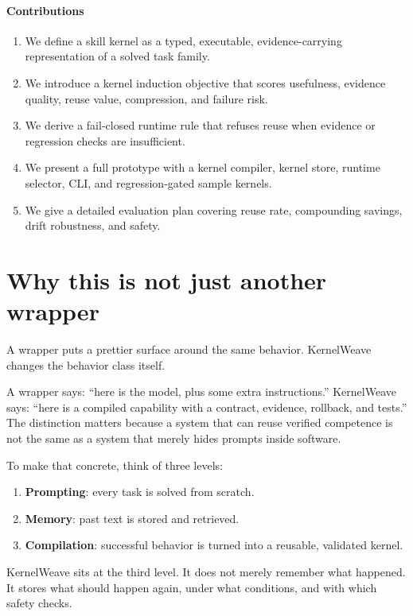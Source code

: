 \documentclass{article}
\begin{document}
\paragraph{Contributions}
\begin{enumerate}[leftmargin=1.2em]
\item We define a skill kernel as a typed, executable, evidence-carrying representation of a solved task family.
\item We introduce a kernel induction objective that scores usefulness, evidence quality, reuse value, compression, and failure risk.
\item We derive a fail-closed runtime rule that refuses reuse when evidence or regression checks are insufficient.
\item We present a full prototype with a kernel compiler, kernel store, runtime selector, CLI, and regression-gated sample kernels.
\item We give a detailed evaluation plan covering reuse rate, compounding savings, drift robustness, and safety.
\end{enumerate}

\section{Why this is not just another wrapper}

A wrapper puts a prettier surface around the same behavior. KernelWeave changes the behavior class itself.

A wrapper says: ``here is the model, plus some extra instructions.'' KernelWeave says: ``here is a compiled capability with a contract, evidence, rollback, and tests.'' The distinction matters because a system that can reuse verified competence is not the same as a system that merely hides prompts inside software.

To make that concrete, think of three levels:
\begin{enumerate}[leftmargin=1.2em]
\item \textbf{Prompting}: every task is solved from scratch.
\item \textbf{Memory}: past text is stored and retrieved.
\item \textbf{Compilation}: successful behavior is turned into a reusable, validated kernel.
\end{enumerate}

KernelWeave sits at the third level. It does not merely remember what happened. It stores what should happen again, under what conditions, and with which safety checks.
\end{document}
